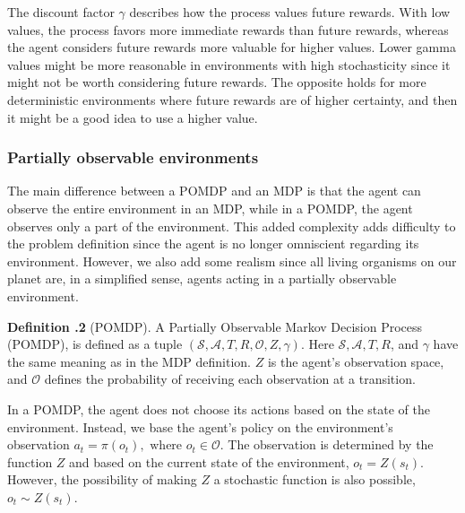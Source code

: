 \documentclass[12pt,A4]{report}
\theoremstyle{definition}
\newtheorem{definition}{Definition}[section]
\begin{document}

The discount factor $\gamma$ describes how the process values future rewards. With low values, the process favors more immediate rewards than future rewards, whereas the agent considers future rewards more valuable for higher values. Lower gamma values might be more reasonable in environments with high stochasticity since it might not be worth considering future rewards. The opposite holds for more deterministic environments where future rewards are of higher certainty, and then it might be a good idea to use a higher value.


\subsubsection{Partially observable environments}

The main difference between a POMDP and an MDP is that the agent can observe the entire environment in an MDP, while in a POMDP, the agent observes only a part of the environment. This added complexity adds difficulty to the problem definition since the agent is no longer omniscient regarding its environment. However, we also add some realism since all living organisms on our planet are, in a simplified sense, agents acting in a partially observable environment.

\begin{displayquote}
  \textbf{Definition \thesection.2} (POMDP). A Partially Observable Markov Decision Process (POMDP), is defined as a tuple $(\mathcal{S}, \mathcal{A}, T, R, \mathcal{O}, Z, \gamma)$. Here $\mathcal{S}, \mathcal{A}, T, R$, and $\gamma$ have the same meaning as in the MDP definition. $Z$ is the agent's observation space, and $\mathcal{O}$ defines the probability of receiving each observation at a transition. 
\end{displayquote}
In a POMDP, the agent does not choose its actions based on the state of the environment. Instead, we base the agent's policy on the environment's observation $a_t = \pi(o_t), \text{ where } o_t \in \mathcal{O}$. The observation is determined by the function $Z$ and based on the current state of the environment, $o_t = Z(s_t)$. However, the possibility of making $Z$ a stochastic function is also possible, $o_t \sim Z(s_t)$.
\end{document}
